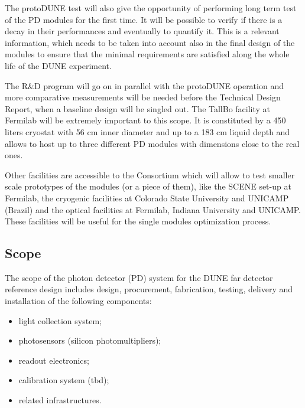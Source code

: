 The protoDUNE test will also give the opportunity of performing long 
term test of the PD modules for the first time. It will be possible to 
verify if there is a decay in their performances and eventually to 
quantify it. This is a relevant information, which needs to be taken into 
account also in the final design of the modules to ensure that the 
minimal requirements are satisfied along the whole life of the DUNE 
experiment.

The R\&D program will go on in parallel with the protoDUNE operation and 
more comparative measurements will be needed before the Technical Design 
Report, when a baseline design will be singled out.
The TallBo facility at Fermilab will be extremely important to this scope. 
It is constituted by a 450 liters cryostat with 56 cm inner diameter and up 
to a 183 cm liquid depth and allows to host up to three different PD 
modules with dimensions close to the real ones.

Other facilities are accessible to the Consortium which will allow to test 
smaller scale prototypes of the modules (or a piece of them), like the 
SCENE set-up at Fermilab, the cryogenic facilities at Colorado State 
University and UNICAMP (Brazil) and the optical facilities at Fermilab, 
Indiana University and UNICAMP. These facilities will be useful for the 
single modules optimization process.
         

\subsection{Scope}
\label{sec:fdsp-pd-scope}
The scope of the photon detector (PD) system for the DUNE far detector 
reference design includes design, procurement, fabrication, testing,
 delivery and installation of the following components:
\begin{itemize}
        \item light collection system;
        \item photosensors (silicon photomultipliers);
        \item readout electronics;
        \item calibration system (tbd);
        \item related infrastructures.
\end{itemize}
